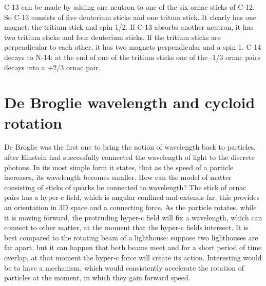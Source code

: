 C-13 can be made by adding one neutron to one of the six ornac sticks of C-12. So C-13 consists of five deuterium sticks and one tritum stick. It clearly has one magnet: the tritium stick and spin 1/2. If C-13 absorbs another neutron, it has two tritium sticks and four deuterium sticks. If the tritium sticks are perpendicular to each other, it has two magnets perpendicular and a spin 1. C-14 decays to N-14: at the end of one of the tritium sticks one of the -1/3 ornac pairs decays into a +2/3 ornac pair.

\section{
De Broglie wavelength and cycloid rotation}

De Broglie was the first one to bring the notion of wavelength back to particles, after Einstein had successfully connected the wavelength of light to the discrete photons. In its most simple form it states, that as the speed of a particle increases, its wavelength becomes smaller. How can the model of matter consisting of sticks of quarks be connected to wavelength? The stick of ornac pairs has a hyper-c field, which is angular confined and extends far, this provides an orientation in 3D space and a connecting force. As the particle rotates, while it is moving forward, the protruding hyper-c field will fix a wavelength, which can connect to other matter, at the moment that the hyper-c fields intersect. It is best compared to the rotating beam of a lighthouse: suppose two lighthouses are far apart, but it can happen that both beams meet and for a short period of time overlap, at that moment the hyper-c force will create its action.
Interesting would be to have a mechanism, which would consistently accelerate the rotation of particles at the moment, in which they gain forward speed.







